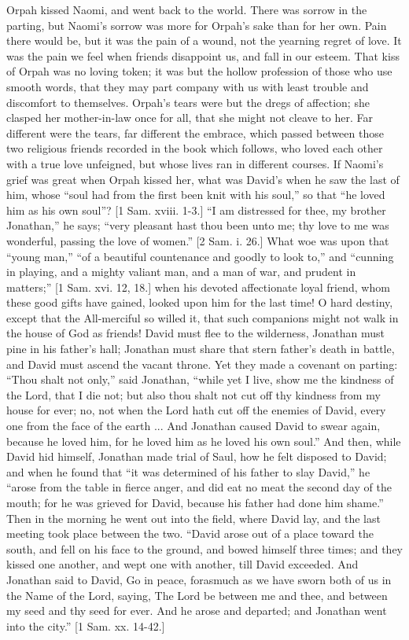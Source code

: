 Orpah kissed Naomi, and went back to the world. There was sorrow in
the parting, but Naomi's sorrow was more for Orpah's sake than for her
own. Pain there would be, but it was the pain of a wound, not the
yearning regret of love. It was the pain we feel when friends
disappoint us, and fall in our esteem. That kiss of Orpah was no
loving token; it was but the hollow profession of those who use smooth
words, that they may part company with us with least trouble and
discomfort to themselves. Orpah's tears were but the dregs of
affection; she clasped her mother-in-law once for all, that she might
not cleave to her. Far different were the tears, far different the
embrace, which passed between those two religious friends recorded in
the book which follows, who loved each other with a true love
unfeigned, but whose lives ran in different courses. If Naomi's grief
was great when Orpah kissed her, what was David's when he saw the last
of him, whose ``soul had from the first been knit with his
soul,'' so that ``he loved him as his own soul''? [1 Sam.
xviii. 1-3.] ``I am distressed for thee, my brother
Jonathan,'' he says; ``very pleasant hast thou been unto me;
thy love to me was wonderful, passing the love of women.'' [2 Sam.
i. 26.] What woe was upon that ``young man,'' ``of a
beautiful countenance and goodly to look to,'' and ``cunning
in playing, and a mighty valiant man, and a man of war, and prudent in
matters;'' [1 Sam. xvi. 12, 18.] when his devoted affectionate
loyal friend, whom these good gifts have gained, looked upon him for
the last time! O hard destiny, except that the All-merciful so willed
it, that such companions might not walk in the house of God as
friends! David must flee to the wilderness, Jonathan must pine in his
father's hall; Jonathan must share that stern father's death in
battle, and David must ascend the vacant throne. Yet they made a
covenant on parting: ``Thou shalt not only,'' said Jonathan,
``while yet I live, show me the kindness of the Lord, that I die
not; but also thou shalt not cut off thy kindness from my house for
ever; no, not when the Lord hath cut off the enemies of David, every
one from the face of the earth ... And Jonathan caused David to swear
again, because he loved him, for he loved him as he loved his own
soul.'' And then, while David hid himself, Jonathan made trial of
Saul, how he felt disposed to David; and when he found that ``it
was determined of his father to slay David,'' he ``arose from
the table in fierce anger, and did eat no meat the second day of the
mouth; for he was grieved for David, because his father had done him
shame.'' Then in the morning he went out into the field, where
David lay, and the last meeting took place between the two.
``David arose out of a place toward the south, and fell on his
face to the ground, and bowed himself three times; and they kissed one
another, and wept one with another, till David exceeded. And Jonathan
said to David, Go in peace, forasmuch as we have sworn both of us in
the Name of the Lord, saying, The Lord be between me and thee, and
between my seed and thy seed for ever. And he arose and departed; and
Jonathan went into the city.'' [1 Sam. xx. 14-42.]

